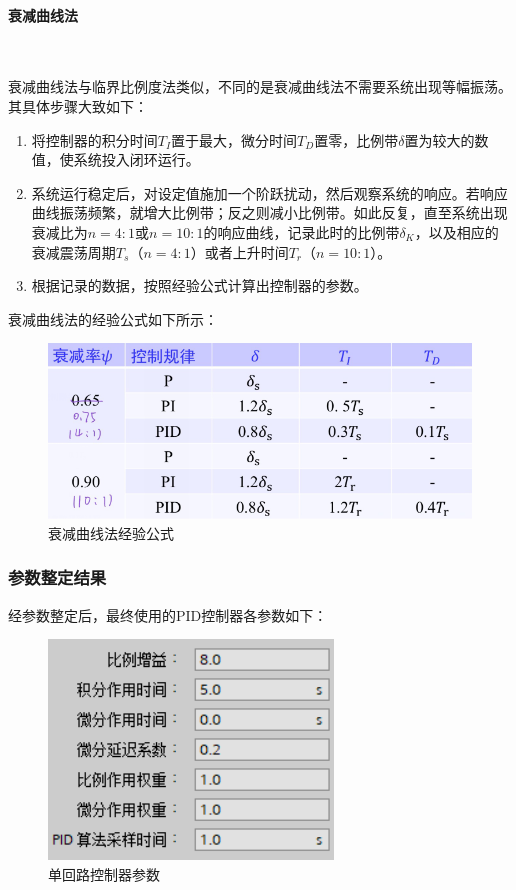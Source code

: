 \documentclass[UTF8]{article}
\begin{document}
\paragraph{衰减曲线法}~{}

衰减曲线法与临界比例度法类似，不同的是衰减曲线法不需要系统出现等幅振荡。其具体步骤大致如下：
\begin{enumerate}
    \item 将控制器的积分时间$T_I$置于最大，微分时间$T_D$置零，比例带$\delta$置为较大的数值，使系统投入闭环运行。
    \item 系统运行稳定后，对设定值施加一个阶跃扰动，然后观察系统的响应。若响应曲线振荡频繁，就增大比例带；反之则减小比例带。如此反复，直至系统出现衰减比为$n = 4:1$或$n = 10:1$的响应曲线，记录此时的比例带$\delta_K$，以及相应的衰减震荡周期$T_s$（$n = 4:1$）或者上升时间$T_r$（$n = 10:1$）。
    \item 根据记录的数据，按照经验公式计算出控制器的参数。
\end{enumerate}

衰减曲线法的经验公式如下所示：
\begin{figure}[H]
    \centering %
    \includegraphics[width=.6\textwidth]{figure/衰减曲线法经验公式.png} 
    \caption{衰减曲线法经验公式} %
\end{figure}

\subsubsection{参数整定结果}
经参数整定后，最终使用的PID控制器各参数如下：
\begin{figure}[H]
    \centering %
    \includegraphics[width=.4\textwidth]{figure/单回路-模块-PID参数.png} 
    \caption{单回路控制器参数} %
\end{figure}
\end{document}
